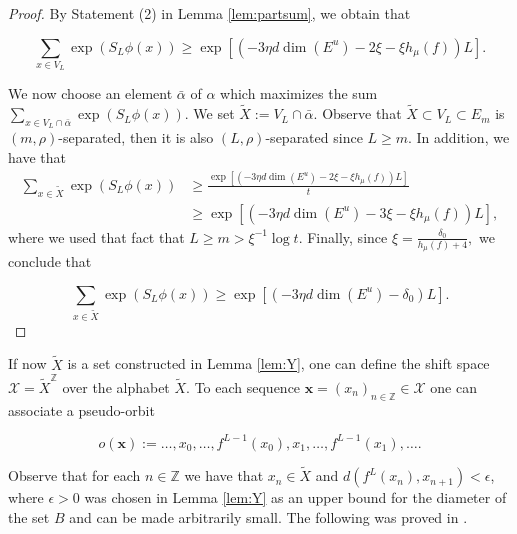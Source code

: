 \documentclass{amsart}
\theoremstyle{plain}
\theoremstyle{definition}
\theoremstyle{remark}
\numberwithin{equation}{section}
\begin{document}
\begin{proof}
By Statement (2) in Lemma \ref{lem:partsum}, we obtain that

$$\sum_{x\in V_L} \exp(S_L\phi(x))   \geq     \exp   [  (-3\eta d \dim(E^u) -  2 \xi  - \xi h_{\mu}(f)   )L ] . $$ 

We now choose an element $\bar{\alpha}$ of $\alpha$ which maximizes the sum $\sum_{x\in V_L \cap \bar{\alpha}} \exp(S_L\phi(x)) .$
We set $\tilde{X}:= V_L \cap \bar{\alpha}$.
Observe that $\tilde{X} \subset V_L\subset E_m$ is $(m,\rho)$-separated, then it is also $(L,\rho)$-separated since $L\geq m$.
In addition, we have that
\begin{align*}
 \sum_{x\in    \tilde{X}} \exp(S_L\phi(x)) & \geq   \frac{  \exp [  (-3\eta d \dim(E^u) -  2 \xi  - \xi h_{\mu}(f)   )L ] }{t}\\
&  \geq  \exp [  (-3\eta d \dim(E^u) -  3 \xi  - \xi h_{\mu}(f)   )L ],  
\end{align*}
where we used that fact that $L\geq m >   \xi^{-1}\log t  .$
Finally, since $\xi = \frac{\delta_0}{h_{\mu}(f) +4},$ we conclude that

 $$\sum_{x\in    \tilde{X}} \exp(S_L\phi(x)) \geq     \exp [  (-3\eta d \dim(E^u)    -   \delta_0   )L ].$$
\end{proof}

If now $\tilde{X}$ is a set constructed in Lemma \ref{lem:Y}, one
can define the shift space $\mathcal{X}=\tilde{X}^{\mathbb{Z}}$ over the alphabet $\tilde{X}$. 
To each sequence  $\textbf{x}=(x_n)_{n\in\mathbb{Z}}\in \mathcal{X}$ one can associate a pseudo-orbit

$$   o(\textbf{x})  := \ldots  ,   x_0, \ldots, f^{L-1}(x_0), x_1 , \ldots , f^{L-1}(x_1), \ldots.   $$

Observe that for each $n\in\mathbb{Z}$ we have that $x_n\in \tilde{X}$ and $d(f^L(x_n), x_{n+1})<\epsilon$, where $\epsilon>0$ was chosen in Lemma \ref{lem:Y} as an upper bound for the diameter of the set $B$ and can be made arbitrarily small.  
The following was proved in \cite[Theorem 8.3]{ACW}.
\end{document}
